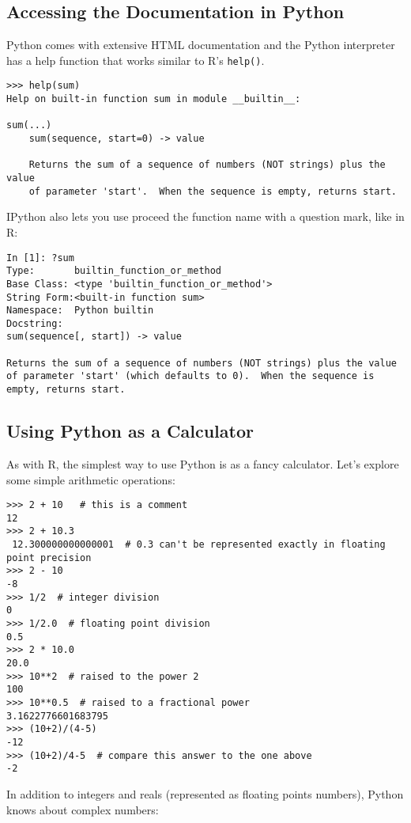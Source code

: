 \subsection{Accessing the Documentation in Python}

Python comes with extensive HTML documentation and the Python
interpreter has a help function that works similar to R's
\lstinline!help()!.

\begin{lstlisting}
>>> help(sum)
Help on built-in function sum in module __builtin__:

sum(...)
    sum(sequence, start=0) -> value

    Returns the sum of a sequence of numbers (NOT strings) plus the value
    of parameter 'start'.  When the sequence is empty, returns start.
\end{lstlisting}
IPython also lets you use proceed the function name with a question
mark, like in R:

\begin{lstlisting}
In [1]: ?sum
Type:       builtin_function_or_method
Base Class: <type 'builtin_function_or_method'>
String Form:<built-in function sum>
Namespace:  Python builtin
Docstring:
sum(sequence[, start]) -> value

Returns the sum of a sequence of numbers (NOT strings) plus the value
of parameter 'start' (which defaults to 0).  When the sequence is
empty, returns start.
\end{lstlisting}
\subsection{Using Python as a Calculator}

As with R, the simplest way to use Python is as a fancy calculator.
Let's explore some simple arithmetic operations:

\begin{lstlisting}
>>> 2 + 10   # this is a comment
12
>>> 2 + 10.3
 12.300000000000001  # 0.3 can't be represented exactly in floating point precision
>>> 2 - 10
-8
>>> 1/2  # integer division
0
>>> 1/2.0  # floating point division
0.5
>>> 2 * 10.0
20.0
>>> 10**2  # raised to the power 2
100
>>> 10**0.5  # raised to a fractional power
3.1622776601683795
>>> (10+2)/(4-5)
-12
>>> (10+2)/4-5  # compare this answer to the one above 
-2
\end{lstlisting}
In addition to integers and reals (represented as floating points
numbers), Python knows about complex numbers:

